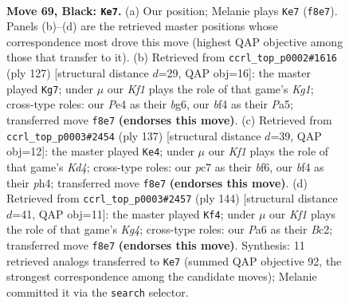 \documentclass[11pt]{article}
\begin{document}
\clearpage

\begin{figure}[p]\centering
\begin{subfigure}{0.46\textwidth}\centering
\resizebox{\linewidth}{!}{%
\newchessgame
\chessboard[
  setfen={5k1K/n1P5/p7/P2r1p1p/4pBb1/6P1/8/RN6 b - - 45 69},
  showmover=false,
  pgfstyle=straightmove, color=movearrow, markmove={f8-e7}
]}
\caption{}
\end{subfigure}\hfill
\begin{subfigure}{0.46\textwidth}\centering
\resizebox{\linewidth}{!}{%
\newchessgame
\chessboard[
  setfen={6k1/8/1p4B1/p1p1p3/P1PbP3/5RP1/KP6/7r b - - 14 64},
  showmover=false,
  pgfstyle=straightmove, color=movearrow, markmove={g8-g7}
]}
\caption{}
\end{subfigure}
\\[4pt]
\begin{subfigure}{0.46\textwidth}\centering
\resizebox{\linewidth}{!}{%
\newchessgame
\chessboard[
  setfen={8/8/5B2/3k1p1p/6bP/PR4P1/r7/5K2 b - - 5 69},
  showmover=false,
  pgfstyle=straightmove, color=movearrow, markmove={d5-e4}
]}
\caption{}
\end{subfigure}\hfill
\begin{subfigure}{0.46\textwidth}\centering
\resizebox{\linewidth}{!}{%
\newchessgame
\chessboard[
  setfen={8/1r2b1k1/3pP3/3P4/1pR3K1/1Pp5/2B5/8 w - - 16 73},
  showmover=false,
  pgfstyle=straightmove, color=movearrow, markmove={g4-f4}
]}
\caption{}
\end{subfigure}
\caption{\textbf{Move 69, Black: \texttt{Ke7}.} (a) Our position; Melanie plays \texttt{Ke7} (\texttt{f8e7}). Panels (b)--(d) are the retrieved master positions whose correspondence most drove this move (highest QAP objective among those that transfer to it). (b) Retrieved from \texttt{ccrl\_top\_p0002\#1616} (ply 127) [structural distance $d$=29, QAP obj=16]: the master played \texttt{Kg7}; under $\mu$ our \emph{Kf1} plays the role of that game's \emph{Kg1}; cross-type roles: our \emph{P}e4 as their \emph{b}g6, our \emph{b}f4 as their \emph{P}a5; transferred move \texttt{f8e7} \textbf{(endorses this move)}. (c) Retrieved from \texttt{ccrl\_top\_p0003\#2454} (ply 137) [structural distance $d$=39, QAP obj=12]: the master played \texttt{Ke4}; under $\mu$ our \emph{Kf1} plays the role of that game's \emph{Kd4}; cross-type roles: our \emph{p}c7 as their \emph{b}f6, our \emph{b}f4 as their \emph{p}h4; transferred move \texttt{f8e7} \textbf{(endorses this move)}. (d) Retrieved from \texttt{ccrl\_top\_p0003\#2457} (ply 144) [structural distance $d$=41, QAP obj=11]: the master played \texttt{Kf4}; under $\mu$ our \emph{Kf1} plays the role of that game's \emph{Kg4}; cross-type roles: our \emph{P}a6 as their \emph{B}c2; transferred move \texttt{f8e7} \textbf{(endorses this move)}. Synthesis: 11 retrieved analogs transferred to \texttt{Ke7} (summed QAP objective 92, the strongest correspondence among the candidate moves); Melanie committed it via the \texttt{search} selector.}
\label{fig:thought-m137}
\end{figure}
\end{document}
